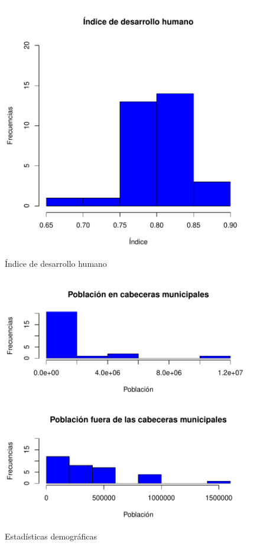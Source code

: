 \documentclass{article}
\begin{document}
\begin{figure}[h]
\centering
\includegraphics{Articulo1-histIDH}
\caption{Índice de desarrollo humano}
\label{barplots}
\end{figure}

\begin{figure}[h]
\centering
\includegraphics{Articulo1-histPOB}
\caption{Estadísticas demográficas}
\label{barplot2}
\end{figure}
\end{document}
